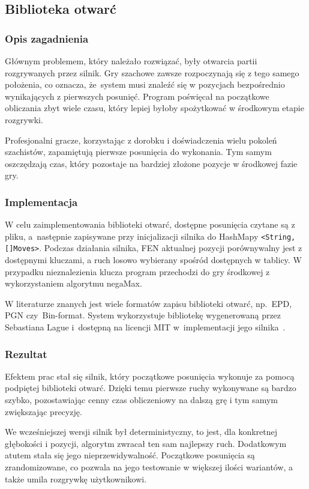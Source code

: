 \subsection{Biblioteka otwarć}
\label{subsec:biblioteka-otwarc}

\subsubsection{Opis zagadnienia}
Głównym problemem, który należało rozwiązać, były otwarcia partii rozgrywanych przez silnik.
Gry szachowe zawsze rozpoczynają się z tego samego położenia, co oznacza, że~system musi znaleźć się w pozycjach bezpośrednio wynikających z pierwszych posunięć.
Program poświęcał na początkowe obliczania zbyt wiele czasu, który lepiej byłoby spożytkować w środkowym etapie rozgrywki.

Profesjonalni gracze, korzystając z dorobku i doświadczenia wielu pokoleń szachistów, zapamiętują pierwsze posunięcia do wykonania.
Tym samym oszczędzają czas, który pozostaje na bardziej złożone pozycje w środkowej fazie gry.

\subsubsection{Implementacja}
W celu zaimplementowania biblioteki otwarć, dostępne posunięcia czytane są z pliku, a~następnie zapisywane przy inicjalizacji silnika do HashMapy \texttt{<String, []Moves>}.
Podczas działania silnika, FEN aktualnej pozycji porównywalny jest z dostępnymi kluczami, a ruch losowo wybierany spośród dostępnych w tablicy.
W przypadku nieznalezienia klucza program przechodzi do gry środkowej z wykorzystaniem algorytmu negaMax.

W literaturze znanych jest wiele formatów zapisu biblioteki otwarć, np.\ EPD, PGN czy~Bin-format.
System wykorzystuje bibliotekę wygenerowaną przez Sebastiana Lague i~dostępną na licencji MIT w~implementacji jego silnika~\cite*{opening-library}.
\subsubsection{Rezultat}
Efektem prac stał się silnik, który początkowe posunięcia wykonuje za pomocą podpiętej biblioteki otwarć.
Dzięki temu pierwsze ruchy wykonywane są bardzo szybko, pozostawiając cenny czas obliczeniowy na dalszą grę i tym samym zwiększając precyzję.

We wcześniejszej wersji silnik był deterministyczny, to jest, dla konkretnej głębokości i pozycji, algorytm zwracał ten sam najlepszy ruch.
Dodatkowym atutem stała się jego nieprzewidywalność.
Początkowe posunięcia są zrandomizowane, co pozwala na jego testowanie w większej ilości wariantów, a także umila rozgrywkę użytkownikowi.
